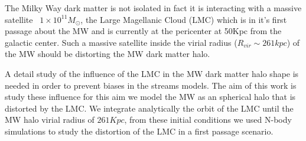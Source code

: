 The Milky Way dark matter is not isolated in fact it is interacting with a 
massive satellite ~$1\times10^{11}M_{\odot}$, the Large Magellanic Cloud (LMC)
which is in it's first passage about the MW and is currently at the pericenter
at 50Kpc from the galactic center. Such a massive satellite inside the virial 
radius ($R_{vir}\sim 261kpc$) of the MW should be distorting the MW dark matter
halo.

A detail study of the influence of the LMC in the MW dark matter halo
shape is needed in order to prevent biases in the streams models. 
The aim of this work is study these influence for this aim 
we model the MW as an spherical halo that is distorted by the LMC. We integrate 
analytically the orbit of the LMC until the MW halo virial radius of $261Kpc$, 
from these initial conditions we used N-body simulations to study the distortion 
of the LMC in a first passage scenario.   
  

